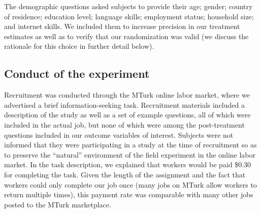 \documentclass{cscw2010}
\begin{document}
The demographic questions asked subjects to provide their age; gender;
country of residence; education level; language skills; employment
status; household size; and internet skills. We included them to
increase precision in our treatment estimates as well as to verify
that our randomization was valid (we discuss the rationale for this
choice in further detail below).

\subsection{Conduct of the experiment}

Recruitment was conducted through the MTurk online labor market, where
we advertised a brief information-seeking task. Recruitment materials
included a description of the study as well as a set of example
questions, all of which were included in the actual job, but none of
which were among the post-treatment questions included in our outcome
variables of interest. Subjects were not informed that they were
participating in a study at the time of recruitment so as to preserve
the ``natural'' environment of the field experiment in the online
labor market. In the task description, we explained that workers would
be paid \$0.30 for completing the task. Given the length of the
assignment and the fact that workers could only complete our job once
(many jobs on MTurk allow workers to return multiple times), this
payment rate was comparable with many other jobs posted to the MTurk
marketplace.
\end{document}
